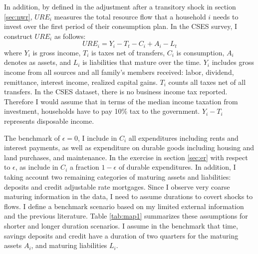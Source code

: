 \documentclass[11pt,letterpaper]{article}
\begin{document}
In addition, by defined in the adjustment after a transitory shock in section \ref{sec:nwr}, $URE_{i}$ measures the total resource flow that a household $i$ needs to invest over the first period of their consumption plan. In the CSES survey, I construct $URE_{i}$ as follows: 
\begin{equation}
URE_{i} = Y_{i} - T_{t} - C_{i} + A_{i} - L_{t}
\end{equation}
\noindent where $Y_{i}$ is gross income, $T_{i}$ is taxes net of transfers, $C_{i}$ is consumption, $A_{i}$ denotes as assets, and $L_{i}$ is liabilities that mature over the time. $Y_{i}$ includes gross income from all sources and all family's members received: labor, dividend, remittance, interest income, realized capital gains. $T_{i}$ counts all taxes net of all transfers. In the CSES dataset, there is no business income tax reported. Therefore I would assume that in terms of the median income taxation from investment, households have to pay 10\% tax to the government. $Y_{i}-T_{i}$ represents disposable income.

The benchmark of $\epsilon =0$, I include in $C_{i}$ all expenditures including rents and interest payments, as well as expenditure on durable goods including housing and land purchases, and maintenance. In the exercise in section \ref{sec:er} with respect to $\epsilon$, as include in $C_{i}$ a fraction $1-\epsilon$ of durable expenditures. In addition, I taking account two remaining categories of maturing assets and liabilities: deposits and credit adjustable rate mortgages. Since I observe very coarse maturing information in the data, I need to assume durations to covert shocks to flows. I define a benchmark scenario based on my limited external information and the previous literature. Table \ref{tab:map1} summarizes these assumptions for shorter and longer duration scenarios. I assume in the benchmark that time, savings deposits and credit have a duration of two quarters for the maturing assets $A_{i}$, and maturing liabilities $L_{i}$.        


\end{document}
